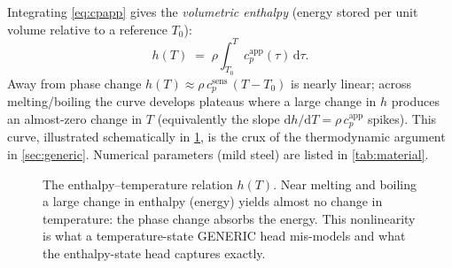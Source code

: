\documentclass[11pt]{article}
\newcommand{\dd}{\mathrm{d}}
\newcommand{\cpapp}{c_p^{\mathrm{app}}}
\newcommand{\cpsens}{c_p^{\mathrm{sens}}}
\theoremstyle{definition}
\begin{document}
Integrating \cref{eq:cpapp} gives the \emph{volumetric enthalpy} (energy stored per
unit volume relative to a reference $T_0$):
\begin{equation}
  h(T) \;=\; \rho \int_{T_0}^{T} \cpapp(\tau)\,\dd\tau .
  \label{eq:enthalpy}
\end{equation}
Away from phase change $h(T)\approx \rho\,\cpsens\,(T-T_0)$ is nearly linear; across
melting/boiling the curve develops plateaus where a large change in $h$ produces an
almost-zero change in $T$ (equivalently the slope $\dd h/\dd T=\rho\,\cpapp$ spikes).
This curve, illustrated schematically in \cref{fig:hcurve}, is the crux of the
thermodynamic argument in \cref{sec:generic}. Numerical parameters
(mild steel) are listed in \cref{tab:material}.

\begin{figure}[t]
\centering
{}
\caption{The enthalpy--temperature relation $h(T)$. Near melting and boiling a
large change in enthalpy (energy) yields almost no change in temperature: the
phase change absorbs the energy. This nonlinearity is what a temperature-state
GENERIC head mis-models and what the enthalpy-state head captures exactly.}
\label{fig:hcurve}
\end{figure}
\end{document}
